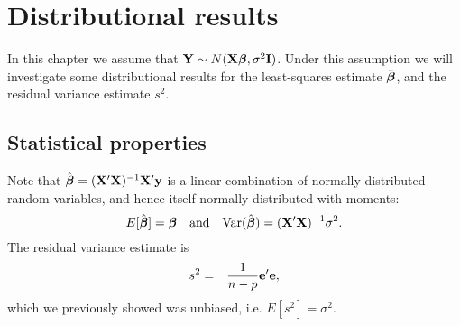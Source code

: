 \section{Distributional results}
In this chapter we assume that $\mathbf{Y} \sim N(\mathbf{X} \boldsymbol{\beta}, \sigma^2 \mathbf{I})$.  Under this assumption we will investigate some distributional results for the least-squares estimate $\hat {\mbox{\boldmath $\beta$}}$, and the residual variance estimate $s^2$.


%
%
%
%
%
%
%
%





\subsection{Statistical properties}
Note that $\hat {\boldsymbol{\beta}} =(\mathbf{X}' \mathbf{X})^{-1} \mathbf{X}' \mathbf{y}$ is a linear combination of normally distributed random variables, and hence itself normally distributed with moments: 
$$
E[\hat {\boldsymbol{\beta}}] = \boldsymbol{\beta} ~~~\mbox{and}~~~ \mbox{Var}(\hat {\boldsymbol{\beta}}) = (\mathbf{X}' \mathbf{X})^{-1} \sigma^2.
$$
The residual variance estimate is 
\begin{eqnarray*}
s^2  &=& \frac{1}{n-p}\mathbf{e}' \mathbf{e},
\end{eqnarray*}
which we previously showed was unbiased, i.e. $E[s^2] = \sigma^2$.  

